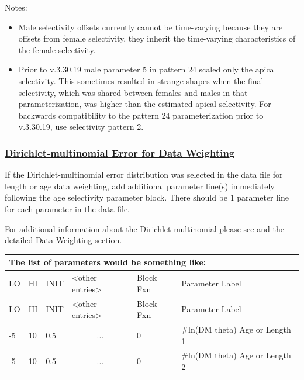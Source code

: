Notes:
\begin{itemize}
	\item Male selectivity offsets currently cannot be time-varying because they are offsets from female selectivity, they inherit the time-varying characteristics of the female selectivity.
    \item Prior to v.3.30.19 male parameter 5 in pattern 24 scaled only the apical selectivity. This sometimes resulted in strange shapes when the final selectivity, which was shared between females and males in that parameterization, was higher than the estimated apical selectivity. For backwards compatibility to the pattern 24 parameterization prior to v.3.30.19, use selectivity pattern 2.
\end{itemize}

\hypertarget{Dirichletparameter}{}
\subsubsection[Dirichlet-multinomial Error for Data Weighting]{\protect\hyperlink{Dirichletparameter}{Dirichlet-multinomial Error for Data Weighting}}
If the Dirichlet-multinomial error distribution was selected in the data file for length or age data weighting, add additional parameter line(s) immediately following the age selectivity parameter block. There should be 1 parameter line for each parameter in the data file.

For additional information about the Dirichlet-multinomial please see \citet{thorson-model-based-2017} and the detailed \hyperlink{DataWeight}{Data Weighting} section.

	
\begin{longtable}{p{1cm} p{1cm} p{1cm} p{2.9cm} p{1.8cm} p{6.5cm}}
	\multicolumn{6}{l}{The list of parameters would be something like:} \\
	\hline
	LO \Tstrut & HI & INIT & <other entries> & Block Fxn & Parameter Label \Bstrut\\
	\hline
	\endfirsthead
	
	\hline
	LO \Tstrut & HI & INIT & <other entries> & Block Fxn & Parameter Label \Bstrut\\
	\hline
	\endhead

	-5 & 10 & 0.5 & \multicolumn{1}{c}{...} & 0 & \#ln(DM theta) Age or Length 1 \Tstrut\\
	-5 & 10 & 0.5 & \multicolumn{1}{c}{...} & 0 & \#ln(DM theta) Age or Length 2 \Bstrut\\
	\hline
\end{longtable}

